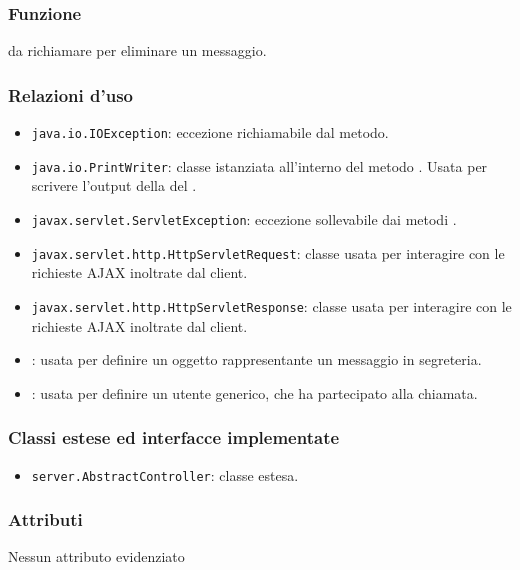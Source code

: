
\subsubsection*{Funzione}
 da richiamare per eliminare un messaggio.

\subsubsection*{Relazioni d'uso}
\begin{itemize}
	\item \texttt{java.io.IOException}: eccezione richiamabile dal metodo.
	\item \texttt{java.io.PrintWriter}: classe istanziata all'interno del metodo . Usata per scrivere l'output della del .
	\item \texttt{javax.servlet.ServletException}: eccezione sollevabile dai metodi .
	\item \texttt{javax.servlet.http.HttpServletRequest}: classe usata per interagire con le richieste AJAX inoltrate dal client.
	\item \texttt{javax.servlet.http.HttpServletResponse}: classe usata per interagire con le richieste AJAX inoltrate dal client.
	\item {}: usata per definire un oggetto rappresentante un messaggio in segreteria.
	\item {}: usata per definire un utente generico, che ha partecipato alla chiamata.
\end{itemize}

\subsubsection*{Classi estese ed interfacce implementate}
\begin{itemize}
	\item \texttt{server.AbstractController}: classe estesa.
\end{itemize}

\subsubsection*{Attributi}

Nessun attributo evidenziato

